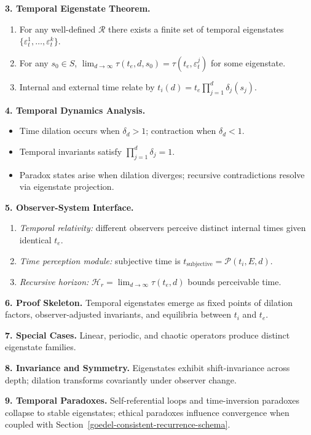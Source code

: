\documentclass[12pt]{article}
\begin{document}
\textbf{3. Temporal Eigenstate Theorem.}
\begin{enumerate}
\item For any well-defined $\mathcal{R}$ there exists a finite set of temporal eigenstates $\{\varepsilon_t^1,\ldots,\varepsilon_t^k\}$.
\item For any $s_0\in S$, $\lim_{d\to\infty}\tau(t_e,d,s_0) = \tau(t_e,\varepsilon_t^j)$ for some eigenstate.
\item Internal and external time relate by $t_i(d) = t_e \prod_{j=1}^{d} \delta_j(s_j)$.
\end{enumerate}

\textbf{4. Temporal Dynamics Analysis.}
\begin{itemize}
\item Time dilation occurs when $\delta_d>1$; contraction when $\delta_d<1$.
\item Temporal invariants satisfy $\prod_{j=1}^{d}\delta_j = 1$.
\item Paradox states arise when dilation diverges; recursive contradictions resolve via eigenstate projection.
\end{itemize}

\textbf{5. Observer-System Interface.}
\begin{enumerate}
\item \emph{Temporal relativity:} different observers perceive distinct internal times given identical $t_e$.
\item \emph{Time perception module:} subjective time is $t_{\text{subjective}} = \mathcal{P}(t_i,E,d)$.
\item \emph{Recursive horizon:} $\mathcal{H}_r = \lim_{d\to\infty}\tau(t_e,d)$ bounds perceivable time.
\end{enumerate}

\textbf{6. Proof Skeleton.} Temporal eigenstates emerge as fixed points of dilation factors, observer-adjusted invariants, and equilibria between $t_i$ and $t_e$.

\textbf{7. Special Cases.} Linear, periodic, and chaotic operators produce distinct eigenstate families.

\textbf{8. Invariance and Symmetry.} Eigenstates exhibit shift-invariance across depth; dilation transforms covariantly under observer change.

\textbf{9. Temporal Paradoxes.} Self-referential loops and time-inversion paradoxes collapse to stable eigenstates; ethical paradoxes influence convergence when coupled with Section~\ref{goedel-consistent-recurrence-schema}.
\end{document}
